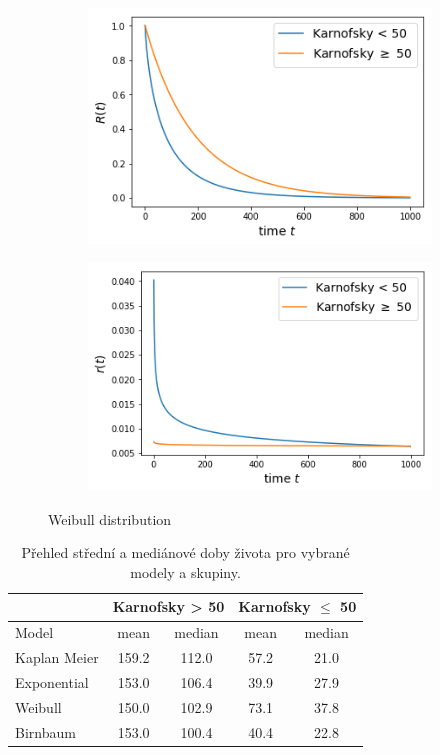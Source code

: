 \documentclass[10pt]{article}
\begin{document}
   
    \begin{figure}[htb!]
\centering
    \begin{subfigure}{.4\linewidth}
    \centering
    \includegraphics[width=.99\textwidth]{Images/kar/Swei.png}
  \end{subfigure}%
    \begin{subfigure}{.4\linewidth}
    \centering
    \includegraphics[width=.99\textwidth]{Images/kar/rwei.png}
  \end{subfigure}%
  \caption{Weibull distribution}\label{fig:karexp} 
   \end{figure} 
    
    
\begin{table}[htb!]
\centering
\begin{tabular}{lcccc}
 &  \multicolumn{2}{c}{Karnofsky > 50} & \multicolumn{2}{c}{Karnofsky $\leq$ 50}\\ 
\toprule
Model & mean & median & mean & median \\
\midrule
Kaplan Meier & 159.2 & 112.0 &  57.2 & 21.0\\
Exponential & 153.0 & 106.4 &  39.9 & 27.9 \\
Weibull & 150.0 & 102.9 & 73.1 & 37.8\\
Birnbaum & 153.0 & 100.4 & 40.4 & 22.8\\
\end{tabular}
\caption{Přehled střední a mediánové doby života pro vybrané modely a skupiny.}\label{tab:kar}
\end{table}    
    
\end{document}
